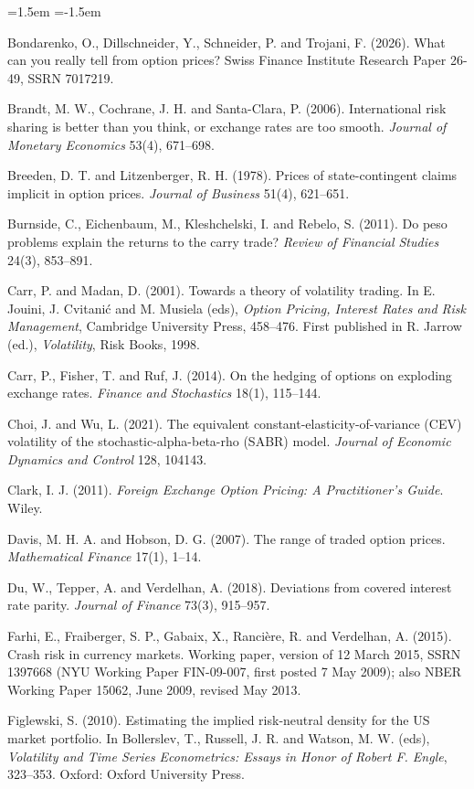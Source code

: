 \documentclass[11pt]{article}
\theoremstyle{remark}
\begin{document}
\begin{list}{}{\leftmargin=1.5em \itemindent=-1.5em \itemsep=2pt \parsep=0pt}
\item Bondarenko, O., Dillschneider, Y., Schneider, P. and Trojani, F. (2026). What can you really tell from option prices? Swiss Finance Institute Research Paper 26-49, SSRN 7017219.
\item Brandt, M. W., Cochrane, J. H. and Santa-Clara, P. (2006). International risk sharing is better than you think, or exchange rates are too smooth. \emph{Journal of Monetary Economics} 53(4), 671--698.
\item Breeden, D. T. and Litzenberger, R. H. (1978). Prices of state-contingent claims implicit in option prices. \emph{Journal of Business} 51(4), 621--651.
\item Burnside, C., Eichenbaum, M., Kleshchelski, I. and Rebelo, S. (2011). Do peso problems explain the returns to the carry trade? \emph{Review of Financial Studies} 24(3), 853--891.
\item Carr, P. and Madan, D. (2001). Towards a theory of volatility trading. In E. Jouini, J. Cvitani\'c and M. Musiela (eds), \emph{Option Pricing, Interest Rates and Risk Management}, Cambridge University Press, 458--476. First published in R. Jarrow (ed.), \emph{Volatility}, Risk Books, 1998.
\item Carr, P., Fisher, T. and Ruf, J. (2014). On the hedging of options on exploding exchange rates. \emph{Finance and Stochastics} 18(1), 115--144.
\item Choi, J. and Wu, L. (2021). The equivalent constant-elasticity-of-variance (CEV) volatility of the stochastic-alpha-beta-rho (SABR) model. \emph{Journal of Economic Dynamics and Control} 128, 104143.
\item Clark, I. J. (2011). \emph{Foreign Exchange Option Pricing: A Practitioner's Guide}. Wiley.
\item Davis, M. H. A. and Hobson, D. G. (2007). The range of traded option prices. \emph{Mathematical Finance} 17(1), 1--14.
\item Du, W., Tepper, A. and Verdelhan, A. (2018). Deviations from covered interest rate parity. \emph{Journal of Finance} 73(3), 915--957.
\item Farhi, E., Fraiberger, S. P., Gabaix, X., Ranci\`ere, R. and Verdelhan, A. (2015). Crash risk in currency markets. Working paper, version of 12 March 2015, SSRN 1397668 (NYU Working Paper FIN-09-007, first posted 7 May 2009); also NBER Working Paper 15062, June 2009, revised May 2013.
\item Figlewski, S. (2010). Estimating the implied risk-neutral density for the US market portfolio. In Bollerslev, T., Russell, J. R. and Watson, M. W. (eds), \emph{Volatility and Time Series Econometrics: Essays in Honor of Robert F. Engle}, 323--353. Oxford: Oxford University Press.

\end{list}
\end{document}

